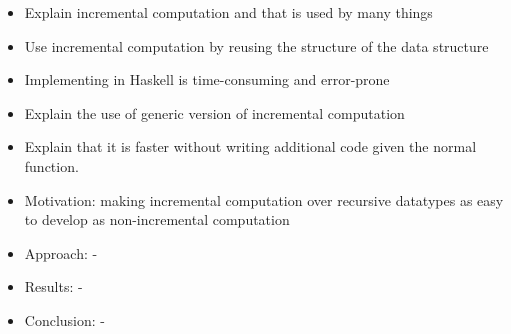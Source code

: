 

\begin{itemize}
  \item Explain incremental computation and that is used by many things
  \item Use incremental computation by reusing the structure of the data structure
  \item Implementing in Haskell is time-consuming and error-prone
  \item Explain the use of generic version of incremental computation
  \item Explain that it is faster without writing additional code given the normal function.
\end{itemize}

\begin{itemize}
  \item Motivation: making incremental computation over recursive datatypes as easy to develop as non-incremental computation
  \item Approach: -
  \item Results: -
  \item Conclusion: -
\end{itemize}

